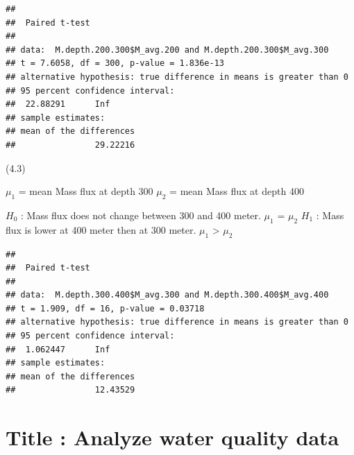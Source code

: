 \documentclass[]{article}
\newenvironment{Shaded}{\begin{snugshade}}{\end{snugshade}}
\newcommand{\DataTypeTok}[1]{\textcolor[rgb]{0.13,0.29,0.53}{#1}}
\newcommand{\FloatTok}[1]{\textcolor[rgb]{0.00,0.00,0.81}{#1}}
\newcommand{\KeywordTok}[1]{\textcolor[rgb]{0.13,0.29,0.53}{\textbf{#1}}}
\newcommand{\NormalTok}[1]{#1}
\newcommand{\OperatorTok}[1]{\textcolor[rgb]{0.81,0.36,0.00}{\textbf{#1}}}
\newcommand{\OtherTok}[1]{\textcolor[rgb]{0.56,0.35,0.01}{#1}}
\newcommand{\StringTok}[1]{\textcolor[rgb]{0.31,0.60,0.02}{#1}}
\begin{document}
\begin{verbatim}
## 
##  Paired t-test
## 
## data:  M.depth.200.300$M_avg.200 and M.depth.200.300$M_avg.300
## t = 7.6058, df = 300, p-value = 1.836e-13
## alternative hypothesis: true difference in means is greater than 0
## 95 percent confidence interval:
##  22.88291      Inf
## sample estimates:
## mean of the differences 
##                29.22216
\end{verbatim}

(4.3)

\(\mu_1\) = mean Mass flux at depth 300 \(\mu_2\) = mean Mass flux at
depth 400

\(H_0\) : Mass flux does not change between 300 and 400 meter. \(\mu_1\)
= \(\mu_2\) \(H_1\) : Mass flux is lower at 400 meter then at 300 meter.
\(\mu_1\) \textgreater{} \(\mu_2\)

\begin{Shaded}
\end{Shaded}

\begin{verbatim}
## 
##  Paired t-test
## 
## data:  M.depth.300.400$M_avg.300 and M.depth.300.400$M_avg.400
## t = 1.909, df = 16, p-value = 0.03718
## alternative hypothesis: true difference in means is greater than 0
## 95 percent confidence interval:
##  1.062447      Inf
## sample estimates:
## mean of the differences 
##                12.43529
\end{verbatim}

\hypertarget{title-analyze-water-quality-data}{%
\section{Title : Analyze water quality
data}\label{title-analyze-water-quality-data}}
\end{document}
